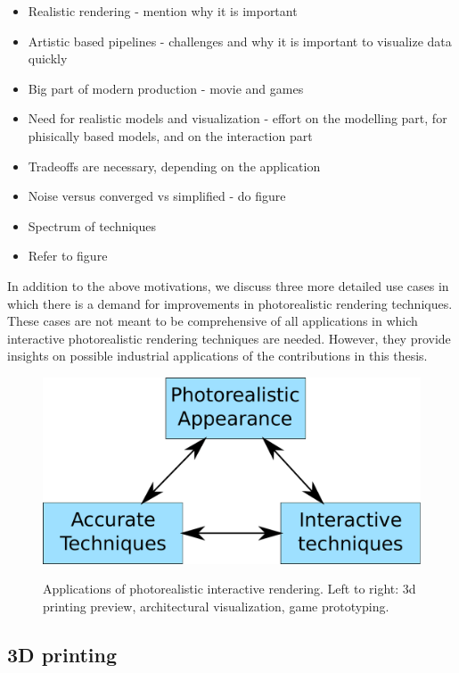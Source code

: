\begin{itemize}
\item Realistic rendering - mention why it is important
\item Artistic based pipelines - challenges and why it is important to visualize data quickly
\item Big part of modern production - movie and games
\item Need for realistic models and visualization - effort on the modelling part, for phisically based models, and on the interaction part 
\item Tradeoffs are necessary, depending on the application
\item Noise versus converged vs simplified - do figure 
\item Spectrum of techniques
\item Refer to figure
\end{itemize}

In addition to the above motivations, we discuss three more detailed use cases in which there is a demand for improvements in photorealistic rendering techniques. These cases are not meant to be comprehensive of all applications in which interactive photorealistic rendering techniques are needed. However, they provide insights on possible industrial applications of the contributions in this thesis.

\begin{figure}
\centering
	 \includegraphics[draft,width=\textwidth]{figures/main_diagram}  \\
\caption{Applications of photorealistic interactive rendering. Left to right: 3d printing preview, architectural visualization, game prototyping.} 
\label{fig:applications}
\end{figure}

\subsection{3D printing}

